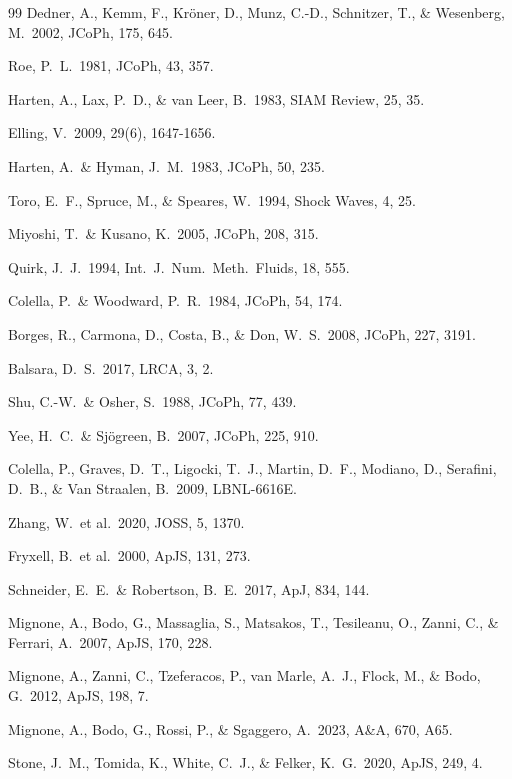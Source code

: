 \documentclass[11pt,a4paper]{article}
\begin{document}
\begin{thebibliography}{99}
 Dedner, A., Kemm, F., Kr\"oner, D., Munz, C.-D., Schnitzer, T., \& Wesenberg, M.\ 2002, JCoPh, 175, 645.

 Roe, P.\ L.\ 1981, JCoPh, 43, 357.

 Harten, A., Lax, P.\ D., \& van Leer, B.\ 1983, SIAM Review, 25, 35.

 Elling, V.\ 2009, 29(6), 1647-1656.

 Harten, A.\ \& Hyman, J.\ M.\ 1983, JCoPh, 50, 235.

 Toro, E.\ F., Spruce, M., \& Speares, W.\ 1994, Shock Waves, 4, 25.

 Miyoshi, T.\ \& Kusano, K.\ 2005, JCoPh, 208, 315.

 Quirk, J.\ J.\ 1994, Int.\ J.\ Num.\ Meth.\ Fluids, 18, 555.

 Colella, P.\ \& Woodward, P.\ R.\ 1984, JCoPh, 54, 174.

 Borges, R., Carmona, D., Costa, B., \& Don, W.\ S.\ 2008, JCoPh, 227, 3191.

 Balsara, D.\ S.\ 2017, LRCA, 3, 2.

 Shu, C.-W.\ \& Osher, S.\ 1988, JCoPh, 77, 439.

 Yee, H.\ C.\ \& Sj\"ogreen, B.\ 2007, JCoPh, 225, 910.

 Colella, P., Graves, D.\ T., Ligocki, T.\ J., Martin, D.\ F., Modiano, D., Serafini, D.\ B., \& Van Straalen, B.\ 2009, LBNL-6616E.

 Zhang, W.\ et al.\ 2020, JOSS, 5, 1370.

 Fryxell, B.\ et al.\ 2000, ApJS, 131, 273.

 Schneider, E.\ E.\ \& Robertson, B.\ E.\ 2017, ApJ, 834, 144.

 Mignone, A., Bodo, G., Massaglia, S., Matsakos, T., Tesileanu, O., Zanni, C., \& Ferrari, A.\ 2007, ApJS, 170, 228.

 Mignone, A., Zanni, C., Tzeferacos, P., van Marle, A.\ J., Flock, M., \& Bodo, G.\ 2012, ApJS, 198, 7.

 Mignone, A., Bodo, G., Rossi, P., \& Sgaggero, A.\ 2023, A\&A, 670, A65.

 Stone, J.\ M., Tomida, K., White, C.\ J., \& Felker, K.\ G.\ 2020, ApJS, 249, 4.


\end{thebibliography}
\end{document}
